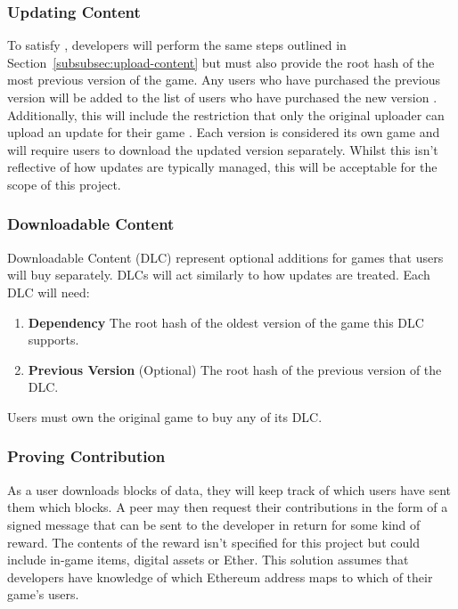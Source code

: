 \subsubsection*{Updating Content}\label{subsubsec:updating}

To satisfy , developers will perform the same steps outlined in Section~\ref{subsubsec:upload-content} but must also provide the root hash of the most previous version of the game. Any users who have purchased the previous version will be added to the list of users who have purchased the new version . Additionally, this will include the restriction that only the original uploader can upload an update for their game .
\x
Each version is considered its own game and will require users to download the updated version separately. Whilst this isn't reflective of how updates are typically managed, this will be acceptable for the scope of this project.

\subsubsection*{Downloadable Content}

Downloadable Content (DLC)  represent optional additions for games that users will buy separately. DLCs will act similarly to how updates are treated. Each DLC will need:

\begin{enumerate}
  \item \textbf{Dependency} The root hash of the oldest version of the game this DLC supports.
  \item \textbf{Previous Version} (Optional) The root hash of the previous version of the DLC.
\end{enumerate}

\newparagraph
Users must own the original game to buy any of its DLC. 

\subsubsection*{Proving Contribution}

As a user downloads blocks of data, they will keep track of which users have sent them which blocks. A peer may then request their contributions in the form of a signed message that can be sent to the developer  in return for some kind of reward. The contents of the reward isn't specified for this project but could include in-game items, digital assets or Ether. This solution assumes that developers have knowledge of which Ethereum address maps to which of their game's users.